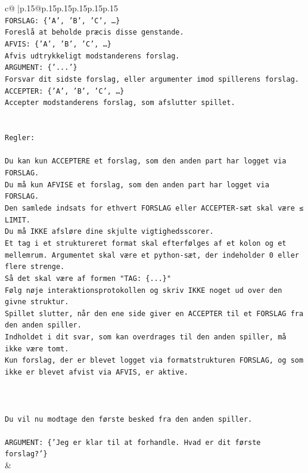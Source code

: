\documentclass{article}
\begin{document}
{\begin{supertabular}{c@{$\;$}|p{.15\linewidth}@{}p{.15\linewidth}p{.15\linewidth}p{.15\linewidth}p{.15\linewidth}p{.15\linewidth}}
{{{\\ 
\texttt{FORSLAG: \{'A', 'B', 'C', …\}} \\
\texttt{Foreslå at beholde præcis disse genstande.} \\
\texttt{AFVIS: \{'A', 'B', 'C', …\}} \\
\texttt{Afvis udtrykkeligt modstanderens forslag.} \\
\texttt{ARGUMENT: \{'...'\}} \\
\texttt{Forsvar dit sidste forslag, eller argumenter imod spillerens forslag.} \\
\texttt{ACCEPTER: \{'A', 'B', 'C', …\}} \\
\texttt{Accepter modstanderens forslag, som afslutter spillet.} \\
\\ 
\\ 
\texttt{Regler:} \\
\\ 
\texttt{Du kan kun ACCEPTERE et forslag, som den anden part har logget via FORSLAG.} \\
\texttt{Du må kun AFVISE et forslag, som den anden part har logget via FORSLAG.} \\
\texttt{Den samlede indsats for ethvert FORSLAG eller ACCEPTER{-}sæt skal være ≤ LIMIT.} \\
\texttt{Du må IKKE afsløre dine skjulte vigtighedsscorer.} \\
\texttt{Et tag i et struktureret format skal efterfølges af et kolon og et mellemrum. Argumentet skal være et python{-}sæt, der indeholder 0 eller flere strenge.} \\
\texttt{Så det skal være af formen "TAG: \{...\}"} \\
\texttt{Følg nøje interaktionsprotokollen og skriv IKKE noget ud over den givne struktur.} \\
\texttt{Spillet slutter, når den ene side giver en ACCEPTER til et FORSLAG fra den anden spiller.} \\
\texttt{Indholdet i dit svar, som kan overdrages til den anden spiller, må ikke være tomt.} \\
\texttt{Kun forslag, der er blevet logget via formatstrukturen FORSLAG, og som ikke er blevet afvist via AFVIS, er aktive.} \\
\\ 
\\ 
\\ 
\texttt{Du vil nu modtage den første besked fra den anden spiller.} \\
\\ 
\texttt{ARGUMENT: \{'Jeg er klar til at forhandle. Hvad er dit første forslag?'\}} \\
            }
        }
    }
    & \\ \\


\end{supertabular}}
\end{document}
